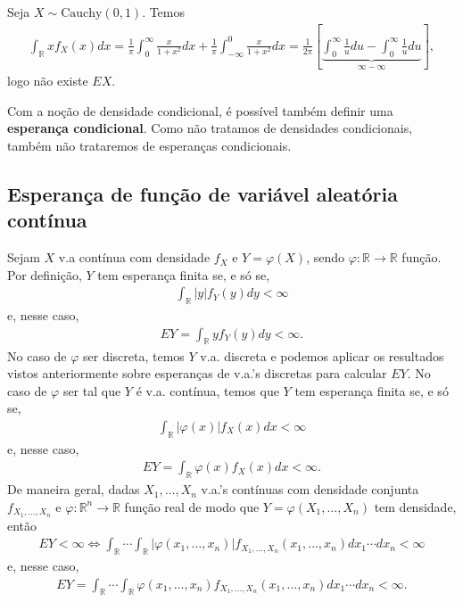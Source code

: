 \documentclass[../Notas.tex]{subfiles}
\begin{document}
\begin{example}
Seja $X\sim\text{Cauchy}(0,1)$. Temos
\begin{align*}
    \int_{\mathbb{R}} xf_X(x) dx = \frac{1}{\pi}\int_{0}^{\infty} \frac{x}{1+x^2} dx + \frac{1}{\pi}\int_{-\infty}^{0} \frac{x}{1+x^2} dx = \frac{1}{2\pi}\left[ \underbrace{\int_{0}^{\infty} \frac{1}{u}du - \int_{0}^{\infty} \frac{1}{u}du}_{\infty - \infty} \right],
\end{align*}
logo não existe $EX$.
\end{example}

\begin{remark}
Com a noção de densidade condicional, é possível também definir uma \textbf{esperança condicional}. Como não tratamos de densidades condicionais, também não trataremos de esperanças condicionais.
\end{remark}

\subsection{Esperança de função de variável aleatória contínua}
Sejam $X$ v.a contínua com densidade $f_X$ e $Y = \varphi(X)$, sendo $\varphi:\mathbb{R}\to\mathbb{R}$ função. Por definição, $Y$ tem esperança finita se, e só se,
\begin{align*}
    \int_{\mathbb{R}} |y|f_Y(y) dy < \infty 
\end{align*}
e, nesse caso,
\begin{align*}
    EY = \int_{\mathbb{R}} yf_Y(y) dy < \infty.
\end{align*}
No caso de $\varphi$ ser discreta, temos $Y$ v.a. discreta e podemos aplicar os resultados vistos anteriormente sobre esperanças de v.a.'s discretas para calcular $EY$. No caso de $\varphi$ ser tal que $Y$ é v.a. contínua, temos que $Y$ tem esperança finita se, e só se,
\begin{align*}
    \int_{\mathbb{R}} |\varphi(x)|f_X(x) dx < \infty
\end{align*}
e, nesse caso,
\begin{align*}
    EY = \int_{\mathbb{R}} \varphi(x)f_X(x) dx < \infty.
\end{align*}
De maneira geral, dadas $X_1, \dots, X_n$ v.a.'s contínuas com densidade conjunta $f_{X_1, \dots, X_n}$ e $\varphi:\mathbb{R}^n\to\mathbb{R}$ função real de modo que $Y = \varphi(X_1, \dots, X_n)$ tem densidade, então
\begin{align*}
    EY < \infty \iff \int_{\mathbb{R}}\cdots\int_{\mathbb{R}} |\varphi(x_1, \dots, x_n)|f_{X_1, \dots, X_n}(x_1, \dots, x_n) dx_1\cdots dx_n < \infty
\end{align*}
e, nesse caso,
\begin{align*}
    EY = \int_{\mathbb{R}}\cdots\int_{\mathbb{R}} \varphi(x_1, \dots, x_n)f_{X_1, \dots, X_n}(x_1, \dots, x_n) dx_1\cdots dx_n < \infty.
\end{align*}
\end{document}
